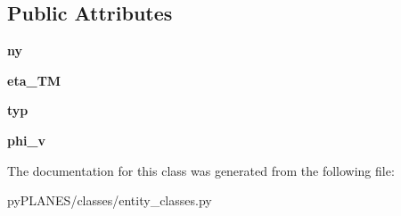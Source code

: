 \subsection*{Public Attributes}
\begin{DoxyCompactItemize}
\item 
\mbox{\label{classpy_p_l_a_n_e_s_1_1classes_1_1entity__classes_1_1_transmission_pw_fem_aaadc0d06ae044fd86d67ed193650c12a}} 
{\bfseries ny}
\item 
\mbox{\label{classpy_p_l_a_n_e_s_1_1classes_1_1entity__classes_1_1_transmission_pw_fem_a2ed0cc1245d69c4683b5aecbb24c0677}} 
{\bfseries eta\+\_\+\+TM}
\item 
\mbox{\label{classpy_p_l_a_n_e_s_1_1classes_1_1entity__classes_1_1_transmission_pw_fem_a3df7dc99a164d0bb8639ab27cc004b79}} 
{\bfseries typ}
\item 
\mbox{\label{classpy_p_l_a_n_e_s_1_1classes_1_1entity__classes_1_1_transmission_pw_fem_af870424308c699a4b9294aeb824e3b09}} 
{\bfseries phi\+\_\+v}
\end{DoxyCompactItemize}


The documentation for this class was generated from the following file\+:\begin{DoxyCompactItemize}
\item 
py\+P\+L\+A\+N\+E\+S/classes/entity\+\_\+classes.\+py\end{DoxyCompactItemize}
